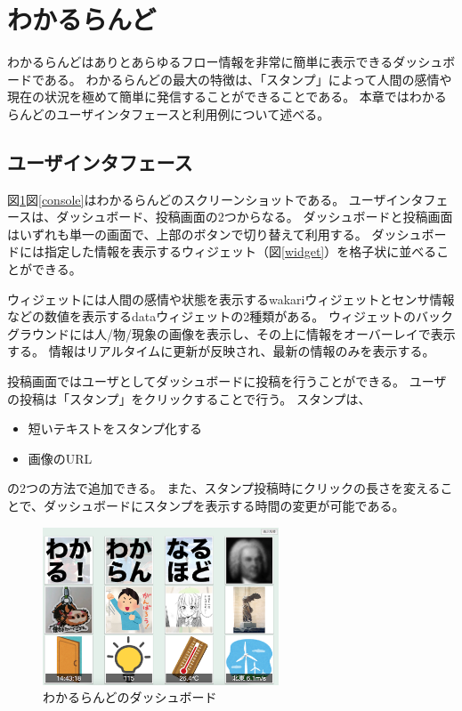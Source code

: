 \section{わかるらんど}

わかるらんどはありとあらゆるフロー情報を非常に簡単に表示できるダッシュボードである。
わかるらんどの最大の特徴は、「スタンプ」によって人間の感情や現在の状況を極めて簡単に発信することができることである。
本章ではわかるらんどのユーザインタフェースと利用例について述べる。

\subsection{ユーザインタフェース}

図\ref{dashboard}図\ref{console}はわかるらんどのスクリーンショットである。
ユーザインタフェースは、ダッシュボード、投稿画面の2つからなる。
ダッシュボードと投稿画面はいずれも単一の画面で、上部のボタンで切り替えて利用する。
ダッシュボードには指定した情報を表示するウィジェット（図\ref{widget}）を格子状に並べることができる。

ウィジェットには人間の感情や状態を表示するwakariウィジェットとセンサ情報などの数値を表示するdataウィジェットの2種類がある。
ウィジェットのバックグラウンドには人/物/現象の画像を表示し、その上に情報をオーバーレイで表示する。
情報はリアルタイムに更新が反映され、最新の情報のみを表示する。

投稿画面ではユーザとしてダッシュボードに投稿を行うことができる。
ユーザの投稿は「スタンプ」をクリックすることで行う。
スタンプは、
\begin{itemize}
\item 短いテキストをスタンプ化する
\item 画像のURL
\end{itemize}
の2つの方法で追加できる。
また、スタンプ投稿時にクリックの長さを変えることで、ダッシュボードにスタンプを表示する時間の変更が可能である。

\begin{figure}[h]
\centering
\includegraphics[width=7cm]{images/dashboard.eps}
\caption{わかるらんどのダッシュボード}
\label{dashboard}
\end{figure}

